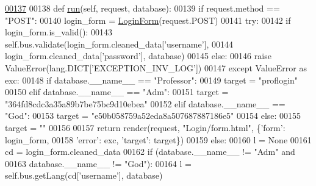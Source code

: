 \begin{DoxyCode}
\hypertarget{classLogin_1_1LoginUnit_1_1UiLogin_l00137}{}\hyperlink{classLogin_1_1LoginUnit_1_1UiLogin_a9cd61a78d5ab0d201051ccf5898f86bc}{00137} 
00138     \textcolor{keyword}{def }\hyperlink{classLogin_1_1LoginUnit_1_1UiLogin_a9cd61a78d5ab0d201051ccf5898f86bc}{run}(self, request, database):
00139         \textcolor{keywordflow}{if} request.method == \textcolor{stringliteral}{"POST"}:
00140             login\_form = \hyperlink{classLogin_1_1forms_1_1LoginForm}{LoginForm}(request.POST)
00141             \textcolor{keywordflow}{try}: 
00142                 \textcolor{keywordflow}{if} login\_form.is\_valid():
00143                     self.bus.validate(login\_form.cleaned\_data[\textcolor{stringliteral}{'username'}],
00144                         login\_form.cleaned\_data[\textcolor{stringliteral}{'password'}], database)
00145                 \textcolor{keywordflow}{else}:
00146                     \textcolor{keywordflow}{raise} ValueError(lang.DICT[\textcolor{stringliteral}{'EXCEPTION\_INV\_LOG'}])
00147             \textcolor{keywordflow}{except} ValueError \textcolor{keyword}{as} exc:
00148                 \textcolor{keywordflow}{if} database.\_\_name\_\_ == \textcolor{stringliteral}{"Professor"}:
00149                     target = \textcolor{stringliteral}{"proflogin"}
00150                 \textcolor{keywordflow}{elif} database.\_\_name\_\_ == \textcolor{stringliteral}{"Adm"}:
00151                     target = \textcolor{stringliteral}{"364fd8cdc3a35a89b7be75bc9d10ebea"}
00152                 \textcolor{keywordflow}{elif} database.\_\_name\_\_ == \textcolor{stringliteral}{"God"}:
00153                     target = \textcolor{stringliteral}{"e50b058759a52eda8a507687887186e5"}
00154                 \textcolor{keywordflow}{else}:
00155                     target = \textcolor{stringliteral}{""}
00156 
00157                 \textcolor{keywordflow}{return} render(request, \textcolor{stringliteral}{"Login/form.html"}, \{\textcolor{stringliteral}{'form'}: login\_form, 
00158                     \textcolor{stringliteral}{'error'}: exc, \textcolor{stringliteral}{'target'}: target\})
00159             \textcolor{keywordflow}{else}:
00160                 l = \textcolor{keywordtype}{None}
00161                 cd = login\_form.cleaned\_data
00162                 \textcolor{keywordflow}{if} (database.\_\_name\_\_ != \textcolor{stringliteral}{"Adm"} \textcolor{keywordflow}{and}
00163                     database.\_\_name\_\_ != \textcolor{stringliteral}{"God"}):
00164                     l = self.bus.getLang(cd[\textcolor{stringliteral}{'username'}], database)

\end{DoxyCode}
